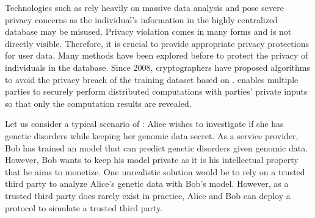 




Technologies such as \machinelearning rely heavily on massive data analysis and pose severe privacy concerns as the individual's information in the highly centralized database may be misused. Privacy violation comes in many forms and is not directly visible. Therefore, it is crucial to provide appropriate privacy protections for user data.
Many methods have been explored before to protect the privacy of individuals in the database.
Since 2008, cryptographers have proposed \ppml algorithms to avoid the privacy breach of the training dataset based on \smpc. \smpc enables multiple parties to securely perform distributed computations with parties' private inputs so that only the computation results are revealed.

Let us consider a typical scenario of \ppml: Alice wishes to investigate if she has genetic disorders while keeping her genomic data secret. As a service provider, Bob has trained an \machinelearning model that can predict genetic disorders given genomic data. However, Bob wants to keep his \machinelearning model private as it is his intellectual property that he aims to monetize. One unrealistic solution would be to rely on a trusted third party to analyze Alice's genetic data with Bob's \machinelearning model. However, as a trusted third party does rarely exist in practice, Alice and Bob can deploy a \smpc protocol to simulate a trusted third party.

